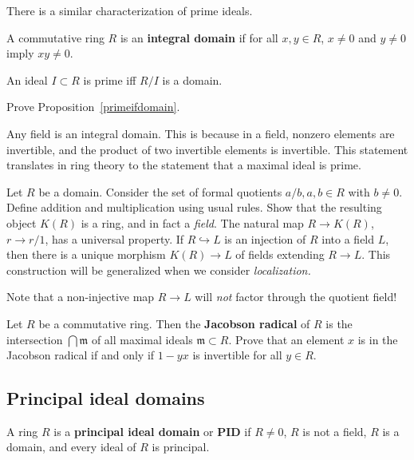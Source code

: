 There is a similar characterization of prime ideals.

\begin{definition} 
A commutative ring $R$ is an \textbf{integral domain} if for all $ x,y \in R$,
$x \neq 0 $ and $y \neq 0$ imply $xy \neq 0$.
\end{definition} 

\begin{proposition}\label{primeifdomain} 
An ideal $I \subset R$ is prime iff $R/I$ is a domain.
\end{proposition} 

\begin{exercise} 
Prove Proposition~\ref{primeifdomain}.
\end{exercise} 

Any field is an integral domain. This is because in a field, nonzero elements
are invertible, and the product of two invertible elements is invertible. This
statement translates in ring theory to the statement that a maximal ideal is
prime.

\begin{exercise} 
Let $R$ be a domain. Consider the set of formal quotients $a/b, a, b \in R$
with $b \neq 0$. Define addition and multiplication using usual rules. Show
that the resulting object $K(R)$ is a ring, and in fact a \emph{field}. The
natural map $R \to K(R)$, $r \to r/1$, has a universal property. If $R
\hookrightarrow L$ is an injection of $R$ into a field $L$, then there is a
unique morphism $K(R) \to L$ of fields extending $R \to L$. This construction
will be generalized when we consider \emph{localization.}

Note that a non-injective map $R\to L$ will \emph{not} factor through the
quotient field!
\end{exercise} 


\begin{exercise}\label{Jacobson} 
Let $R$ be a commutative ring. Then the \textbf{Jacobson radical} of $R$ is
the intersection $\bigcap \mathfrak{m}$ of all maximal ideals $\mathfrak{m}
\subset R$. Prove that an element $x$ is in the Jacobson radical if and only
if $1 - yx$ is invertible for all $y \in R$.
\end{exercise} 

\subsection{Principal ideal domains}

\begin{definition} 
A ring $R$ is a \textbf{principal ideal domain} or \textbf{PID} if $R \neq 0$, $R$ is not a
field, $R$ is a domain, and every ideal of $R$ is principal.
\end{definition} 

